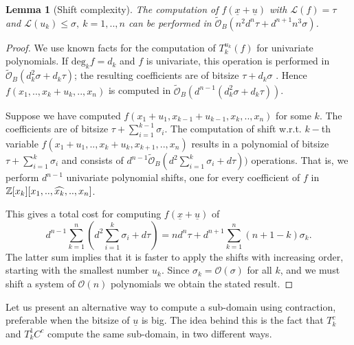 \documentclass{sig-alternate}
\newtheorem{lemma}[theorem]{Lemma}
\newcommand{\dott}{{..}}
\newcommand{\OO}{\ensuremath{\mathcal{O}}\xspace}
\newcommand{\sOB}{\ensuremath{\widetilde{\mathcal{O}}_B}\xspace}
\newcommand{\uvec}[1]{\underline{#1}}
\begin{document}
\begin{lemma}[{Shift complexity}] \label{shiftComplexity} The
  computation of $f(\uvec x + \uvec u)$ with $\mathcal L(f)=\tau$ and
  $\mathcal L(u_k)\leq\sigma,\ k=1,\dott,n$ can be performed in $\sOB(
  n^2 d^n \tau + d^{n+1} n^3 \sigma )$.
\end{lemma}
\begin{proof}
  We use known facts for the computation of $T_k^{u_k}(f)$ for
  univariate polynomials.  If $\text{deg}_k f = d_k$ and $f$ is
  univariate, this operation is performed in
  $\sOB(d_k^2\sigma+d_k\tau)$; the resulting coefficients are of
  bitsize $ \tau +d_k\sigma $ \cite{gg-shift-1997}. 
  Hence $f(x_1,\dott,x_k+u_k,\dott,x_n)$ is
  computed in $\sOB(d^{n-1}(d_k^2\sigma+d_k\tau) )$.

  Suppose we have computed $f(x_1+u_1,x_{k-1}+u_{k-1},x_k,\dott,x_n)$
  for some $k$. The coefficients are of bitsize $\tau
  +\sum_{i=1}^{k-1}\sigma_i$. The computation of shift w.r.t. $k-$th
  variable $f(x_1+u_1,\dott,x_k+u_k,x_{k+1},\dott,x_n)$ results in a
  polynomial of bitsize $\tau+ \sum_{i=1}^k \sigma_i$ and
  consists of $ d^{n-1} \sOB( d^2 \sum_{i=1}^k \sigma_i + d \tau ) )$
  operations. That is, we perform $d^{n-1}$ univariate polynomial
  shifts, one for every coefficient of $f$ in
  $\ZZ[x_k][x_1,\dott,\widehat{x_k},\dott, x_n] $.

  This gives a total cost for computing $f(\uvec x + \uvec u)$ of
$$
d^{n-1} \sum_{k=1}^n \left( d^2 \sum_{i=1}^k \sigma_i + d \tau \right)
= nd^n\tau + d^{n+1} \sum_{k=1}^n (n+1-k)\sigma_k .
$$
The latter sum implies that it is faster to apply the shifts with
increasing order, starting with the smallest number $u_k$. Since
$\sigma_k=\OO(\sigma)$ for all $k$, and we must shift a system of
$\OO(n)$ polynomials we obtain the stated result.
\end{proof}

Let us present an alternative way to compute a sub-domain using
contraction, preferable when the bitsize of $\uvec u$ is big.  The
idea behind this is the fact that $T_k^c$ and $T^1_kC^c$ compute the same
sub-domain, in two different ways. 
\end{document}
